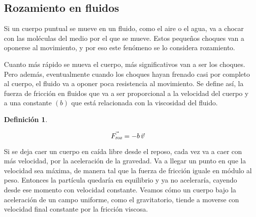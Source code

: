 \documentclass[a5paper,12pt,twoside]{book}
\newtheorem{defn}{{Definición}}[chapter]
\begin{document}
\begin{center}
    \vspace{-2cm}
    \def\svgwidth{\linewidth}
    
    \vspace{-2cm}
\end{center}


\subsection{Rozamiento en fluidos}

Si un cuerpo puntual se mueve en un fluido, como el aire o el agua, va a chocar con las moléculas del medio por el que se mueve. Estos pequeños choques van a oponerse al movimiento, y por eso este fenómeno se lo considera rozamiento.

Cuanto más rápido se mueva el cuerpo, más significativos van a ser los choques. Pero además, eventualmente cuando los choques hayan frenado casi por completo al cuerpo, el fluido va a oponer poca resistencia al movimiento. Se define así, la fuerza de fricción en fluidos que va a ser proporcional a la velocidad del cuerpo y a una constante $(b)$ que está relacionada con la viscosidad del fluido.

\begin{mdframed}[style=MyFrame1]
    \begin{defn}
        \label{defn:fluidFrictionForce}
    \end{defn}
    \begin{equation*}
        \Vec{{{F}_\textsl{{roz}}}} = - b \, \Vec{v}
    \end{equation*}
\end{mdframed}

Si se deja caer un cuerpo en caída libre desde el reposo, cada vez va a caer con más velocidad, por la aceleración de la gravedad. Va a llegar un punto en que la velocidad sea máxima, de manera tal que la fuerza de fricción iguale en módulo al peso. Entonces la partícula quedaría en equilibrio y ya no aceleraría, cayendo desde ese momento con velocidad constante. Veamos cómo un cuerpo bajo la aceleración de un campo uniforme, como el gravitatorio, tiende a moverse con velocidad final constante por la fricción viscosa.

\begin{center}
    \vspace{-2cm}
    \def\svgwidth{\linewidth}
    
    \vspace{-2cm}
\end{center}
\end{document}
